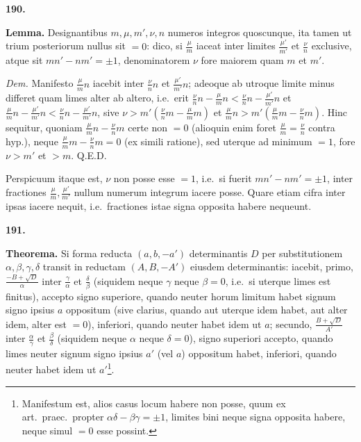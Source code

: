 \documentclass[12pt,a4paper]{article}
\theoremstyle{plain}
\theoremstyle{definition}
\theoremstyle{remark}
\newcommand{\qeode}{\textsc{Q.E.D.}}
\begin{document}
\textbf{190.}

\textbf{Lemma.} Designantibus $m,\mu,m',\nu,n$ numeros integros quoscunque, ita tamen ut trium posteriorum nullus sit $=0$: dico, si $\frac{\mu}{m}$ iaceat inter limites $\frac{\mu'}{m'}$ et $\frac{\nu}{n}$ exclusive, atque sit $mn'-nm'=\pm 1$, denominatorem $\nu$ fore maiorem quam $m$ et $m'$.

\textit{Dem.} Manifesto $\frac{\mu}{m}n$ iacebit inter $\frac{\nu}{n}n$ et $\frac{\mu'}{m'}n$; adeoque ab utroque limite minus differet quam limes alter ab altero, i.e.\ erit $\frac{\nu}{n}n-\frac{\mu}{m}n<\frac{\nu}{n}n-\frac{\mu'}{m'}n$ et $\frac{\mu}{m}n-\frac{\mu'}{m'}n<\frac{\nu}{n}n-\frac{\mu'}{m'}n$, sive $\nu>m'(\frac{\nu}{n}m-\frac{\mu}{m}m)$ et $\frac{\mu}{m}n>m'(\frac{\mu}{m}m-\frac{\nu}{n}m)$. Hinc sequitur, quoniam $\frac{\mu}{m}n-\frac{\nu}{n}m$ certe non $=0$ (alioquin enim foret $\frac{\mu}{m}=\frac{\nu}{n}$ contra hyp.), neque $\frac{\mu}{m}m-\frac{\nu}{n}m=0$ (ex simili ratione), sed uterque ad minimum $=1$, fore $\nu>m'$ et $>m$. \qeode

Perspicuum itaque est, $\nu$ non posse esse $=1$, i.e.\ si fuerit $mn'-nm'=\pm 1$, inter fractiones $\frac{\mu}{m},\frac{\mu'}{m'}$ nullum numerum integrum iacere posse. Quare etiam cifra inter ipsas iacere nequit, i.e.\ fractiones istae signa opposita habere nequeunt.

\textbf{191.}

\textbf{Theorema.} Si forma reducta $(a,b,-a')$ determinantis $D$ per substitutionem $\alpha,\beta,\gamma,\delta$ transit in reductam $(A,B,-A')$ eiusdem determinantis: iacebit, primo, $\frac{-B+\sqrt{D}}{\alpha}$ inter $\frac{\gamma}{\alpha}$ et $\frac{\delta}{\beta}$ (siquidem neque $\gamma$ neque $\beta=0$, i.e.\ si uterque limes est finitus), accepto signo superiore, quando neuter horum limitum habet signum signo ipsius $a$ oppositum (sive clarius, quando aut uterque idem habet, aut alter idem, alter est $=0$), inferiori, quando neuter habet idem ut $a$; secundo, $\frac{B+\sqrt{D}}{A'}$ inter $\frac{\alpha}{\gamma}$ et $\frac{\beta}{\delta}$ (siquidem neque $\alpha$ neque $\delta=0$), signo superiori accepto, quando limes neuter signum signo ipsius $a'$ (vel $a$) oppositum habet, inferiori, quando neuter habet idem ut $a'$\footnote{Manifestum est, alios casus locum habere non posse, quum ex art.\ praec.\ propter $\alpha\delta-\beta\gamma=\pm 1$, limites bini neque signa opposita habere, neque simul $=0$ esse possint.}.
\end{document}
